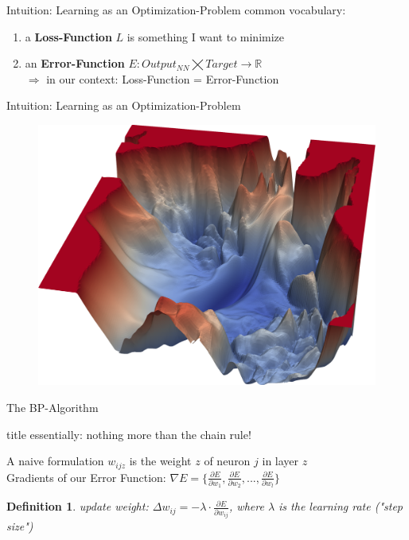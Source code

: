 \documentclass{beamer}
\newtheorem{mydef}{Definition}
\begin{document}
\begin{frame}{Intuition: Learning as an Optimization-Problem}
    common vocabulary:
    \vfill
    \begin{enumerate}
        \item a \textbf{Loss-Function} $L$ is something I want to minimize
        \item an \textbf{Error-Function} $E : Output_{NN} \bigtimes Target \rightarrow \mathbb{R} $ \\
        $\Rightarrow$ in our context: Loss-Function = Error-Function
    \end{enumerate}
\end{frame}

\begin{frame}{Intuition: Learning as an Optimization-Problem}
    \begin{figure}
    \includegraphics[width=\textwidth]{../assets/noshort.png}
    \caption{\cite{DBLP:journals/corr/abs-1712-09913}}
    \end{figure}
\end{frame}

\begin{frame}{The BP-Algorithm}
    \vfill
    \centering
    \begin{beamercolorbox}[sep=8pt,center,shadow=true,rounded=true]{title}
      essentially: nothing more than the chain rule!
    \end{beamercolorbox}
    \vfill
\end{frame}

\begin{frame}{A naive formulation}
    $w_{ijz}$ is the weight $z$ of neuron $j$ in layer $z$\\
    Gradients of our Error Function: $\nabla E = \{\frac{\partial E}{\partial w_{1}}, \frac{\partial E}{\partial w_{2}}, ..., \frac{\partial E}{\partial w_{l}}\}$
    \vfill
    \pause\begin{mydef}
        update weight: $\Delta w_{ij} = - \lambda \cdot \frac{\partial E}{\partial w_{ij}}$, where $\lambda$ is the learning rate ("step size")
    \end{mydef}
\end{frame}
\end{document}
